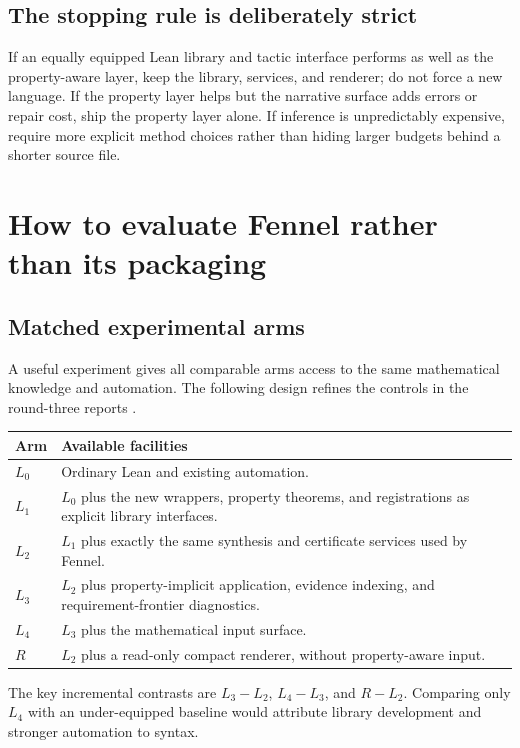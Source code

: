\documentclass[11pt,a4paper]{article}
\theoremstyle{definition}
\theoremstyle{remark}
\begin{document}
\subsection{The stopping rule is deliberately strict}
If an equally equipped Lean library and tactic interface performs as well as
the property-aware layer, keep the library, services, and renderer; do not
force a new language. If the property layer helps but the narrative surface
adds errors or repair cost, ship the property layer alone. If inference is
unpredictably expensive, require more explicit method choices rather than
hiding larger budgets behind a shorter source file.

\section{How to evaluate Fennel rather than its packaging}
\label{sec:evaluation}

\subsection{Matched experimental arms}
A useful experiment gives all comparable arms access to the same mathematical
knowledge and automation. The following design refines the controls in the
round-three reports \cite{synA,synB}.
\begin{center}\small
\begin{tabularx}{\textwidth}{@{}L{12mm}Y@{}}
\toprule
Arm & Available facilities\\
\midrule
$L_0$ & Ordinary Lean and existing automation.\\
$L_1$ & $L_0$ plus the new wrappers, property theorems, and registrations as explicit library interfaces.\\
$L_2$ & $L_1$ plus exactly the same synthesis and certificate services used by Fennel.\\
$L_3$ & $L_2$ plus property-implicit application, evidence indexing, and requirement-frontier diagnostics.\\
$L_4$ & $L_3$ plus the mathematical input surface.\\
$R$ & $L_2$ plus a read-only compact renderer, without property-aware input.\\
\bottomrule
\end{tabularx}
\end{center}
The key incremental contrasts are $L_3-L_2$, $L_4-L_3$, and $R-L_2$. Comparing
only $L_4$ with an under-equipped baseline would attribute library development
and stronger automation to syntax.
\end{document}
